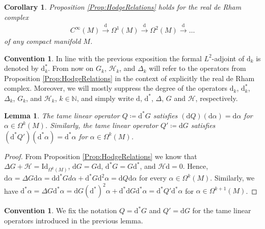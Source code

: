 \documentclass[12pt,a4paper]{article}
\theoremstyle{plain}
\newtheorem{corollary}[theorem]{Corollary}
\newtheorem{lemma}[theorem]{Lemma}
\theoremstyle{definition}
\newtheorem{convention}[theorem]{Convention}
\newcommand{\N}{\mathbb{N}}
\newcommand{\Forms}[1]{\Omega^{#1}(M)}
\newcommand{\Hcal}{\mathcal{H}}
\renewcommand{\d}{\mathrm{d}}
\begin{document}
\begin{corollary}
    Proposition \ref{Prop:HodgeRelations} holds for the real de Rham complex
    \begin{align*}
        C^\infty(M)\stackrel{\d}{\to}\Forms{1}\stackrel{\d}{\to} \Forms{2}\stackrel{\d}{\to}\ldots
    \end{align*}
    of any compact manifold $M$.
\end{corollary}




\begin{convention}
In line with the previous exposition the formal $L^2$-adjoint of $\d_k$ is denoted by $\d^*_k$. 
From now on $G_k$, $\Hcal_k$, and $\Delta_k$ will refer to the operators from Proposition \ref{Prop:HodgeRelations} in the context of explicitly the real de Rham complex.
Moreover, we will mostly suppress the degree of the operators $\d_k$, $\d^*_k$, $\Delta_k$, $G_k$, and $\Hcal_k$, $k\in \N$, and simply write $\d$, $\d^*$, $\Delta$, $G$ and $\Hcal$, respectively.
\end{convention}



\begin{lemma}
\label{Lemma:dQex=Id}
The tame linear operator $Q\coloneqq \d^*G$ satisfies $(\d Q)(\d\alpha)=\d \alpha$ for $\alpha\in \Forms{k}$. Similarly, the tame linear operator $Q'\coloneqq \d G$ satisfies $(\d^*Q')(\d^*\alpha)=\d^*\alpha$ for $\alpha\in \Forms{k}$.
\end{lemma}
\begin{proof}
From Proposition \ref{Prop:HodgeRelations} we know that $\Delta G+\Hcal=\mathrm{Id}_{\Forms{k}}$, $\d G=G\d$, $\d^*G=G\d^*$, and $\Hcal \d=0$. Hence, $\d\alpha=\Delta G\d\alpha=\d \d^*Gd\alpha+\d^*G\d^2\alpha=\d Q\d\alpha$ for every $\alpha\in \Forms{k}$. 
Similarly, we have
$\d^*\alpha=\Delta G\d^*\alpha=\d G(\d^*)^2\alpha+\d^*\d G\d^*\alpha=\d^*Q'\d^*\alpha$
for $\alpha \in \Forms{k+1}$. 
\end{proof}

\begin{convention}
We fix the notation $Q=\d^*G$ and $Q'=\d G$ for the tame linear operators introduced in the previous lemma.
\end{convention}
\end{document}

